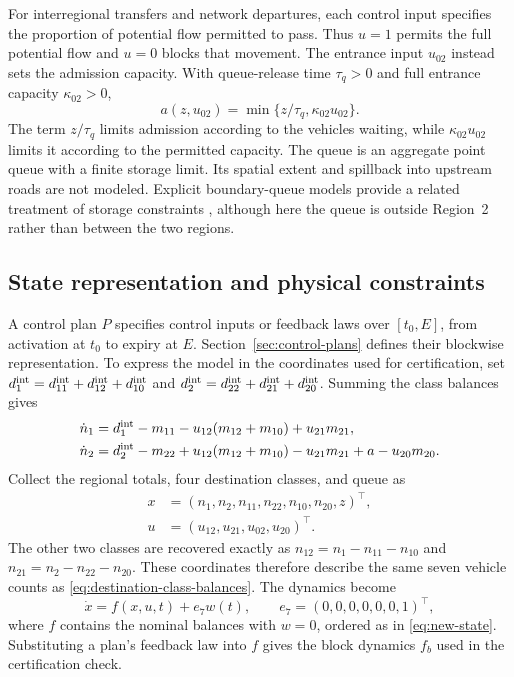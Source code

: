 \documentclass[preprint,12pt]{elsarticle}
\theoremstyle{definition}
\theoremstyle{plain}
\theoremstyle{definition}
\theoremstyle{plain}
\begin{document}
For interregional transfers and network departures, each control input
specifies the proportion of potential flow permitted to pass. Thus
$u=1$ permits the full potential flow and $u=0$ blocks that movement.
The entrance input $u_{02}$ instead sets the admission capacity. With
queue-release time $\tau_q>0$ and full entrance capacity $\kappa_{02}>0$,
\begin{equation}
 a(z,u_{02})=\min\{z/\tau_q,\kappa_{02}u_{02}\}.
 \label{eq:new-admission}
\end{equation}
The term $z/\tau_q$ limits admission according to the vehicles waiting,
while $\kappa_{02}u_{02}$ limits it according to the permitted capacity.
The queue is an aggregate point queue with a finite storage limit.
Its spatial extent and spillback into upstream roads are not modeled.
Explicit boundary-queue models provide a related treatment of storage
constraints \cite{haddad2017queues}, although here the queue is outside
Region~2 rather than between the two regions.

\subsection{State representation and physical constraints}
\label{sec:physical-constraints}

A control plan $P$ specifies control inputs or feedback laws over
$[t_0,E]$, from activation at $t_0$ to expiry at $E$. Section~\ref{sec:control-plans}
defines their blockwise representation. To express the model in the
coordinates used for certification, set
$d_1^{\rm int}=d_{11}^{\rm int}+d_{12}^{\rm int}+d_{10}^{\rm int}$ and
$d_2^{\rm int}=d_{22}^{\rm int}+d_{21}^{\rm int}+d_{20}^{\rm int}$.
Summing the class balances gives
\begin{equation}
\begin{aligned}
\dot n_1&=d_1^{\rm int}-m_{11}-u_{12}(m_{12}+m_{10})+u_{21}m_{21},\\
\dot n_2&=d_2^{\rm int}-m_{22}+u_{12}(m_{12}+m_{10})-u_{21}m_{21}
             +a-u_{20}m_{20}.
\end{aligned}
\label{eq:regional-flow-balances}
\end{equation}
Collect the regional totals, four destination classes, and queue as
\begin{equation}
\begin{aligned}
x&=(n_1,n_2,n_{11},n_{22},n_{10},n_{20},z)^\top,\\
u&=(u_{12},u_{21},u_{02},u_{20})^\top.
\end{aligned}
\label{eq:new-state}
\end{equation}
The other two classes are recovered exactly as
$n_{12}=n_1-n_{11}-n_{10}$ and $n_{21}=n_2-n_{22}-n_{20}$.
These coordinates therefore describe the same seven vehicle counts as
\eqref{eq:destination-class-balances}. The dynamics become
\begin{equation}
 \dot x=f(x,u,t)+e_7w(t),\qquad e_7=(0,0,0,0,0,0,1)^\top,
 \label{eq:new-plant}
\end{equation}
where $f$ contains the nominal balances with $w=0$, ordered as in
\eqref{eq:new-state}. Substituting a plan's feedback law into $f$ gives
the block dynamics $f_b$ used in the certification check.
\end{document}
